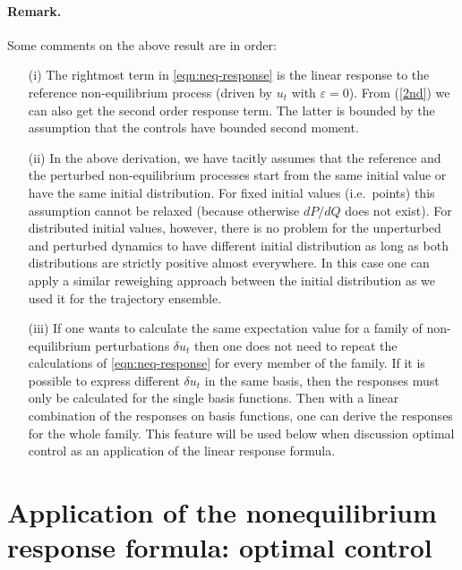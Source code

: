 \documentclass[]{tMPH2e}
\newcommand{\eps}{\varepsilon}
\begin{document}
\paragraph*{Remark.} Some comments on the above result are in order:
\begin{itemize}

\item[(i)] The rightmost term in \eqref{eqn:neq-response} is the linear 
  response to the reference non-equilibrium process (driven by $u_t$ with $\eps=0$). From (\ref{2nd}) we can also get the second order response term. The latter is bounded by the assumption that the controls have bounded second moment.  

\item[(ii)] In the above derivation, we have tacitly assumes that the reference and the perturbed non-equilibrium processes start from the same initial value or
  have the same initial distribution. For fixed initial values (i.e.~points) this assumption cannot be relaxed (because otherwise $dP/dQ$ does not exist). For distributed initial values, however, there is no problem for the unperturbed and perturbed dynamics to have different initial distribution as long as both distributions are strictly positive almost everywhere. In this case one can apply a similar reweighing approach between the initial distribution as we used it for the trajectory ensemble.  

\item[(iii)] If one wants to calculate the same expectation value for a family of non-equilibrium perturbations $\delta u_t$ then 
one does not need to repeat the calculations of \eqref{eqn:neq-response} for every member of the family. 
  If it is possible to
  express different $\delta u_t$ in the same basis, then the responses must only be
  calculated for the single basis functions. Then with a linear combination of the responses on basis functions, one can derive
  the responses for the whole family. This feature will be used below when discussion optimal control as an application of the linear response formula. 
  

\end{itemize}





\section{Application of the nonequilibrium response formula: optimal control}
\end{document}
